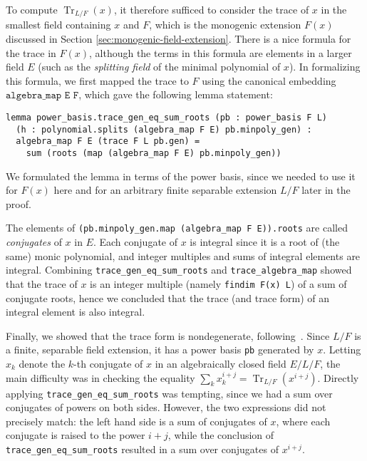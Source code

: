 \documentclass[a4paper,USenglish,cleveref, autoref, thm-restate]{lipics-v2021}
\newcommand{\lean}[1]{\texttt{#1}\xspace} %
\DeclareMathOperator{\Tr}{Tr}
\begin{document}
To compute $\Tr_{L/F}(x)$, it therefore sufficed to consider the trace of $x$ in the smallest field containing $x$ and $F$, which is the monogenic extension $F(x)$ discussed in Section \ref{sec:monogenic-field-extension}.
There is a nice formula for the trace in $F(x)$, although the terms in this formula are elements in a larger field $E$
(such as the \emph{splitting field} of the minimal polynomial of $x$).
In formalizing this formula, we first mapped the trace to $F$ using the canonical embedding $\lean{algebra\_map E F}$,
which gave the following lemma statement:
\begin{lstlisting}
lemma power_basis.trace_gen_eq_sum_roots (pb : power_basis F L)
  (h : polynomial.splits (algebra_map F E) pb.minpoly_gen) :
  algebra_map F E (trace F L pb.gen) =
    sum (roots (map (algebra_map F E) pb.minpoly_gen))
\end{lstlisting}
We formulated the lemma in terms of the power basis, since we needed to use it for $F(x)$ here
and for an arbitrary finite separable extension $L / F$ later in the proof.

The elements of \lean{(pb.minpoly\_gen.map (algebra\_map F E)).roots} are called \emph{conjugates} of $x$ in $E$.
Each conjugate of $x$ is integral since it is a root of (the same) monic polynomial,
and integer multiples and sums of integral elements are integral.
Combining \lean{trace\_gen\_eq\_sum\_roots} and \lean{trace\_algebra\_map} showed that the trace of $x$ is an integer multiple (namely \lean{findim F(x) L}) of a sum of conjugate roots, hence we concluded that the trace (and trace form) of an integral element is also integral.

Finally, we showed that the trace form is nondegenerate, following~\cite[Proposition~2.8]{Neukirch}.
Since $L / F$ is a finite, separable field extension, it has a power basis \lean{pb} generated by $x$.
Letting $x_k$ denote the $k$-th conjugate of $x$ in an algebraically closed field $E / L / F$,
the main difficulty was in checking the equality $\sum_k x_k^{i + j} = \Tr_{L / F} (x^{i + j})$.
Directly applying \lean{trace\_gen\_eq\_sum\_roots} was tempting, since we had a sum over conjugates of powers on both sides.
However, the two expressions did not precisely match: the left hand side is a sum of conjugates of $x$, where each conjugate is raised to the power $i + j$,
while the conclusion of \lean{trace\_gen\_eq\_sum\_roots} resulted in a sum over conjugates of $x^{i + j}$.
\end{document}
